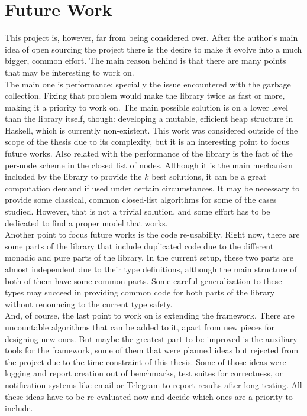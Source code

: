 \section{Future Work}

This project is, however, far from being considered over. After the author's
main idea of open sourcing the project there is the desire to make it evolve
into a much bigger, common effort. The main reason behind is that there are
many points that may be interesting to work on.\\

The main one is performance; specially the issue encountered with the garbage
collection. Fixing that problem would make the library twice as fast or more,
making it a priority to work on. The main possible solution is on a lower level
than the library itself, though: developing a mutable, efficient heap structure
in Haskell, which is currently non-existent. This work was considered outside
of the scope of the thesis due to its complexity, but it is an interesting
point to focus future works. Also related with the performance of the library
is the fact of the per-node scheme in the closed list of nodes. Although it
is the main mechanism included by the library to provide the $k$ best
solutions, it can be a great computation demand if used under certain
circumstances. It may be necessary to provide some classical, common
closed-list algorithms for some of the cases studied. However, that is not a
trivial solution, and some effort has to be dedicated to find a proper model
that works.\\

Another point to focus future works is the code re-usability. Right now, there
are some parts of the library that include duplicated code due to the different
monadic and pure parts of the library. In the current setup, these two parts
are almost independent due to their type definitions, although the main
structure of both of them have some common parts. Some careful generalization
to these types may succeed in providing common code for both parts of the
library without renouncing to the current type safety.\\

And, of course, the last point to work on is extending the framework. There are
uncountable algorithms that can be added to it, apart from new pieces for
designing new ones. But maybe the greatest part to be improved is the auxiliary
tools for the framework, some of them that were planned ideas but rejected from
the project due to the time constraint of this thesis. Some of those ideas were
logging and report creation out of benchmarks, test suites for correctness, or
notification systems like email or Telegram to report results after long
testing. All these ideas have to be re-evaluated now and decide which ones are
a priority to include.\\

\newpage

